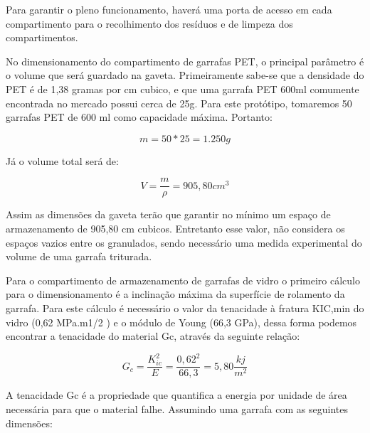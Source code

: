 Para garantir o pleno funcionamento, haverá uma porta de acesso em cada compartimento para o recolhimento dos resíduos e de limpeza dos compartimentos.

No dimensionamento do compartimento de garrafas PET, o principal parâmetro é o volume que será guardado na gaveta. Primeiramente sabe-se que a densidade do PET é de 1,38 gramas por cm cubico, e que uma garrafa PET 600ml comumente encontrada no mercado possui cerca de 25g. Para este protótipo, tomaremos 50 garrafas PET de 600 ml como capacidade máxima. Portanto:

\begin{equation}
    m = 50 \ast 25 = 1.250 g
\end{equation}

Já o volume total será de:

\begin{equation}
    V = \frac{m}{\rho} = 905,80 cm^{3}
\end{equation}

Assim as dimensões da gaveta terão que garantir no mínimo um espaço de armazenamento de 905,80 cm cubicos. Entretanto esse valor, não considera os espaços vazios entre os granulados, sendo necessário uma medida experimental do volume de uma garrafa triturada.

Para o compartimento de armazenamento de garrafas de vidro o primeiro cálculo para o dimensionamento é a inclinação máxima da superfície de rolamento da garrafa. Para este cálculo é necessário o valor da tenacidade à fratura KIC,min do vidro (0,62 MPa.m1/2 ) e o módulo de Young (66,3 GPa), dessa forma podemos encontrar a tenacidade do material Gc, através da seguinte relação:

\begin{equation}
    G_{c} = \frac{K_{ic}^{2}}{E} = \frac{0,62^{2}}{66,3} = 5,80 \frac{kj}{m^{2}}
\end{equation}

A tenacidade Gc é a propriedade que quantifica a energia por unidade de área necessária para que o material falhe. Assumindo uma garrafa com as seguintes dimensões:

